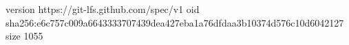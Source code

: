 version https://git-lfs.github.com/spec/v1
oid sha256:e6c757c009a6643333707439dea427eba1a76dfdaa3b10374d576c10d6042127
size 1055
